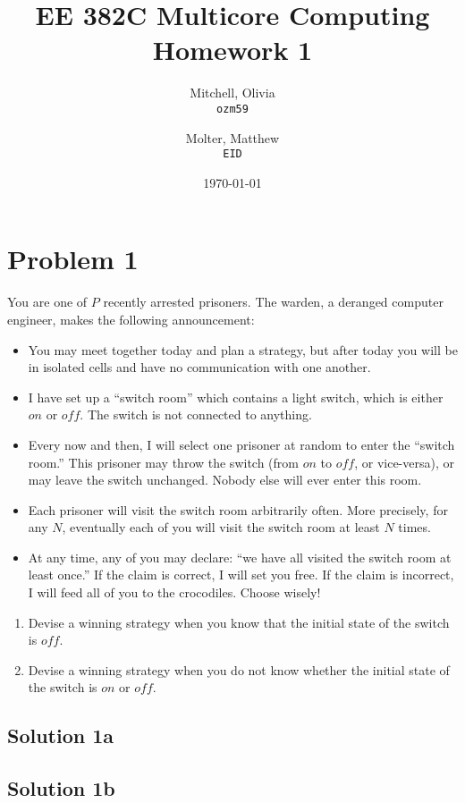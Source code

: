 \documentclass{article}
\title{EE 382C Multicore Computing Homework 1}
\author{
    Mitchell, Olivia\\
    \texttt{ozm59}
    \and
    Molter, Matthew\\
    \texttt{EID}}
\date{\today}
\begin{document}
\maketitle

\section{Problem 1}
 You are one of $P$ recently arrested prisoners. The warden, a deranged computer engineer, makes the following announcement:
\begin{itemize}
  \item You may meet together today and plan a strategy, but after today you will be in isolated cells and have no communication with one another.
  \item I have set up a “switch room” which contains a light switch, which is either $on$ or $off$. The switch is not connected to anything.
  \item Every now and then, I will select one prisoner at random to enter the “switch room.” This prisoner may throw the switch (from $on$ to $off$, or vice-versa), or may leave the switch unchanged. Nobody else will ever enter this room.
  \item Each prisoner will visit the switch room arbitrarily often. More precisely, for any $N$, eventually each of you will visit the switch room at least $N$ times.
  \item At any time, any of you may declare: “we have all visited the switch room at least once.” If the claim is correct, I will set you free. If the claim is incorrect, I will feed all of you to the crocodiles. Choose wisely!
\end{itemize}

\begin{enumerate}[label=\alph*)]
  \item Devise a winning strategy when you know that the initial state of the switch is $off$.
  \item Devise a winning strategy when you do not know whether the initial state of the switch is $on$ or $off$.
\end{enumerate}

\subsection{Solution 1a}

\subsection{Solution 1b}
\end{document}
